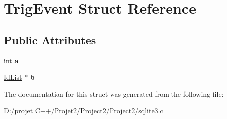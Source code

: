 \hypertarget{struct_trig_event}{}\section{Trig\+Event Struct Reference}
\label{struct_trig_event}
\subsection*{Public Attributes}
\begin{DoxyCompactItemize}
\item 
\mbox{\label{struct_trig_event_a19ac5a5e59e08350f72ec49cf8fccbb6}} 
int {\bfseries a}
\item 
\mbox{\label{struct_trig_event_a86ef160cde95382e98b7934614e7f79f}} 
\mbox{\hyperlink{struct_id_list}{Id\+List}} $\ast$ {\bfseries b}
\end{DoxyCompactItemize}


The documentation for this struct was generated from the following file\+:\begin{DoxyCompactItemize}
\item 
D\+:/projet C++/\+Projet2/\+Project2/\+Project2/sqlite3.\+c\end{DoxyCompactItemize}
